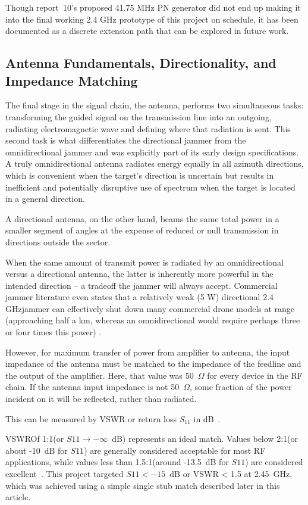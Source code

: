 \documentclass[12pt,a4paper]{report}
\begin{document}
	Though report~10's proposed 41.75 MHz PN generator did not end up making it into the final working 2.4 GHz prototype of this project on schedule, it has been documented as a discrete extension path that can be explored in future work.
	\subsection{Antenna Fundamentals, Directionality, and Impedance Matching}
	The final stage in the signal chain, the antenna, performs two simultaneous tasks: transforming the guided signal on the transmission line into an outgoing, radiating electromagnetic wave and defining where that radiation is sent. This second task is what differentiates the directional jammer from the omnidirectional jammer and was explicitly part of its early design specifications. A truly omnidirectional antenna radiates energy equally in all azimuth directions, which is convenient when the target's direction is uncertain but results in inefficient and potentially disruptive use of spectrum when the target is located in a general direction. 
	
	A directional antenna, on the other hand, beams the same total power in a smaller segment of angles at the expense of reduced or null transmission in directions outside the sector. 
	
	When the same amount of transmit power is radiated by an omnidirectional versus a directional antenna, the latter is inherently more powerful in the intended direction -- a tradeoff the jammer will always accept. Commercial jammer literature even states that a relatively weak (5 W) directional 2.4 GHzjammer can effectively shut down many commercial drone models at range (approaching half a km, whereas an omnidirectional would require perhaps three or four times this power) \cite{ref11}.
	
	However, for maximum transfer of power from amplifier to antenna, the input impedance of the antenna must be matched to the impedance of the feedline and the output of the amplifier. Here, that value was 50~$\Omega$ for every device in the RF chain. If the antenna input impedance is not 50~$\Omega$, some fraction of the power incident on it will be reflected, rather than radiated. 
	
	This can be measured by VSWR or return loss $S_{11}$ in dB~\cite{ref16,ref17}. 
	
	VSWROf 1:1(or $S{11} \rightarrow -\infty$~dB) represents an ideal match. Values below 2:1(or about -10~dB for $S{11}$) are generally considered acceptable for most RF applications, while values less than 1.5:1(around -13.5~dB for $S{11}$) are considered excellent~\cite{ref17}. This project targeted $S{11} < -15$~dB or VSWR < 1.5 at 2.45~GHz, which was achieved using a simple single stub match described later in this article.
	
\end{document}
